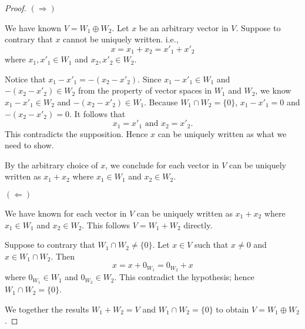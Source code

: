 \begin{Exercise}
\begin{proof}
$(\Longrightarrow)$

We have known $V = W_1\oplus W_2$. Let $x$ be an arbitrary vector in $V$. Suppose to contrary that $x$ cannot be uniquely written. i.e.,
$$
x = x_1+x_2 = x'_1+x'_2
$$
where $x_1, x'_1\in W_1$ and $x_2, x'_2\in W_2$.

Notice that $x_1-x'_1 = -(x_2-x'_2)$. Since $x_1-x'_1\in W_1$ and $-(x_2-x'_2)\in W_2$ from the property of vector spaces in $W_1$ and $W_2$, we know $x_1-x'_1\in W_2$ and $-(x_2-x'_2)\in W_1$. Because $W_1\cap W_2 = \{0\}$, $x_1-x'_1=0$ and $-(x_2-x'_2)=0$. It follows that
$$
x_1 = x'_1\text{ and } x_2 = x'_2.
$$
This contradicts the supposition. Hence $x$ can be uniquely written as what we need to show.

By the arbitrary choice of $x$, we conclude for each vector in $V$ can be uniquely written as $x_1+x_2$ where $x_1\in W_1$ and $x_2\in W_2$.

\vspace{2ex}

$(\Longleftarrow)$

We have known for each vector in $V$ can be uniquely written as $x_1+x_2$ where $x_1\in W_1$ and $x_2\in W_2$. This follows $V = W_1+W_2$ directly.

Suppose to contrary that $W_1\cap W_2\neq \{0\}$. Let $x\in V$ such that $x\neq 0$ and $x\in W_1\cap W_2$. Then
$$
x = x + 0_{W_1} = 0_{W_2} + x
$$
where $0_{W_1}\in W_1$ and $0_{W_2}\in W_2$. This contradict the hypothesis; hence $W_1\cap W_2= \{0\}$.

We together the results $W_1+W_2=V$ and $W_1\cap W_2=\{0\}$ to obtain $V=W_1\oplus W_2$.
\end{proof}
\end{Exercise}